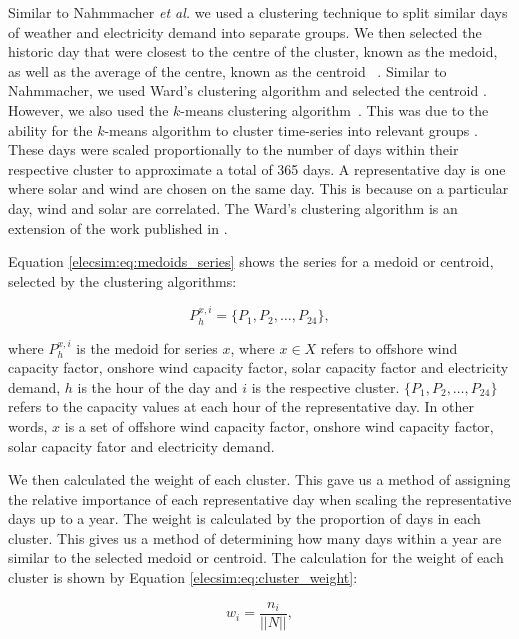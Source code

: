 Similar to Nahmmacher \textit{et al.} \cite{Nahmmacher2016} we used a clustering technique to split similar days of weather and electricity demand into separate groups. We then selected the historic day that were closest to the centre of the cluster, known as the medoid, as well as the average of the centre, known as the centroid ~\cite{Nahmmacher2016}. Similar to Nahmmacher, we used Ward's clustering algorithm and selected the centroid \cite{doi:10.1080/01621459.1963.10500845}. However, we also used the $k$-means clustering algorithm~\cite{forgy65}. This was due to the ability for the $k$-means algorithm to cluster time-series into relevant groups \cite{Kell2018a}. These days were scaled proportionally to the number of days within their respective cluster to approximate a total of 365 days. A representative day is one where solar and wind are chosen on the same day. This is because on a particular day, wind and solar are correlated. The Ward's clustering algorithm is an extension of the work published in \cite{Kell2020}.

Equation \ref{elecsim:eq:medoids_series} shows the series for a medoid or centroid, selected by the clustering algorithms:

\begin{equation}
\label{elecsim:eq:medoids_series}
P^{x,i}_{h}=\{P_1, P_2, \ldots, P_{24}\},
\end{equation}

\noindent where $P^{x,i}_{h}$ is the medoid for series $x$, where $x\in X$ refers to offshore wind capacity factor, onshore wind capacity factor, solar capacity factor and electricity demand, $h$ is the hour of the day and $i$ is the respective cluster. $\{P_1, P_2, \ldots , P_{24}\}$ refers to the capacity values at each hour of the representative day. In other words, $x$ is a set of offshore wind capacity factor, onshore wind capacity factor, solar capacity fator and electricity demand.

We then calculated the weight of each cluster. This gave us a method of assigning the relative importance of each representative day when scaling the representative days up to a year. The weight is calculated by the proportion of days in each cluster. This gives us a method of determining how many days within a year are similar to the selected medoid or centroid. The calculation for the weight of each cluster is shown by Equation \ref{elecsim:eq:cluster_weight}:

\begin{equation}
\label{elecsim:eq:cluster_weight}
w_i = \frac{n_i}{||N||},
\end{equation} 

